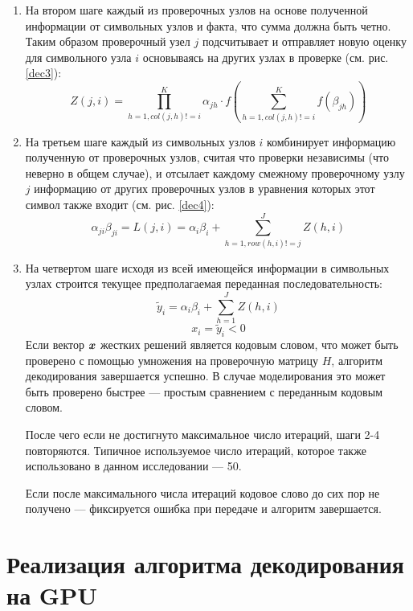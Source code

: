 \begin{enumerate}[label=\arabic*.]
\item На втором шаге каждый из проверочных узлов на основе полученной информации от символьных узлов и факта,
что сумма должна быть четно. Таким образом проверочный узел $j$ подсчитывает и отправляет новую оценку
 для символьного узла $i$ основываясь на других узлах в проверке (см. рис. \ref{dec3}):
\begin{equation} \label{step2}
Z(j,i)=\prod_{h=1,col(j,h)!=i}^{K} \alpha_{jh} \cdot
		f(\sum_{h=1,col(j,h)!=i}^{K}f(\beta_{jh}))
\end{equation}

\item На третьем шаге каждый из символьных узлов $i$ комбинирует информацию полученную от проверочных узлов,
считая что проверки независимы (что неверно в общем случае), и отсылает каждому смежному проверочному узлу $j$ 
информацию от других проверочных узлов в уравнения которых этот символ также входит (см. рис. \ref{dec4}):
\begin{equation} \label{step3}
\alpha_{ji} \beta_{ji} = L(j,i)=\alpha_i \beta_i + \sum_{h=1,row(h,i)!=j}^J Z(h,i)
\end{equation}

\item На четвертом шаге исходя из всей имеющейся информации в символьных узлах строится текущее предполагаемая
переданная последовательность:
\begin{equation} \label{step4}
	\widetilde{y}_i = \alpha_i \beta_i + \sum_{h=1}^J Z(h,i)
\end{equation}
\[
	x_i = \widetilde{y}_i < 0
\]
Если вектор $\boldsymbol{x}$ жестких решений является кодовым словом, что может быть проверено с помощью умножения
 на проверочную матрицу
$H$, алгоритм декодирования завершается успешно. В случае моделирования это может быть проверено быстрее ---
простым сравнением с переданным кодовым словом.

После чего если не достигнуто максимальное число итераций, шаги 2-4 повторяются.
 Типичное используемое число итераций, которое также использовано в данном исследовании --- 50.

Если после максимального числа итераций кодовое слово до сих пор не получено --- фиксируется ошибка при
передаче и алгоритм завершается.
\end{enumerate}
\section{Реализация алгоритма декодирования на GPU}

